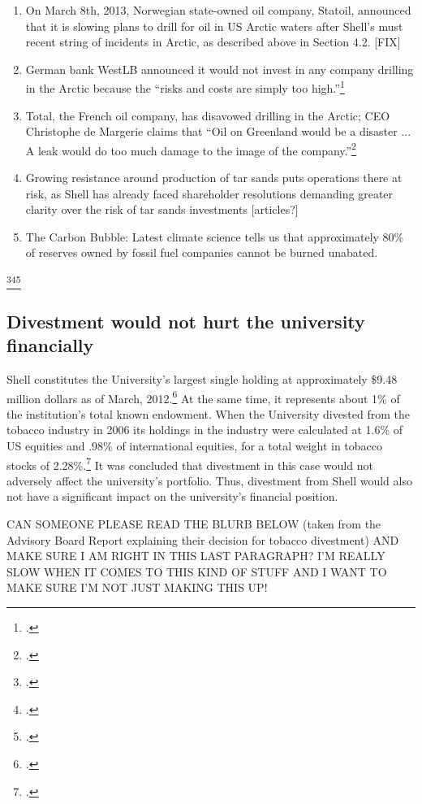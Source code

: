 \begin{enumerate}
	\item On March 8th, 2013, Norwegian state-owned oil company, Statoil, announced that it is slowing plans to drill for oil in US Arctic waters after Shell’s must recent string of incidents in Arctic, as described above in Section 4.2. [FIX]
	\item German bank WestLB announced it would not invest in any company drilling in the Arctic because the ``risks and costs are simply too high.''\footcite[][]{Naidoo_2012}
	\item Total, the French oil company, has disavowed drilling in the Arctic; CEO Christophe de Margerie claims that ``Oil on Greenland would be a disaster ... A leak would do too much damage to the image of the company.''\footcite[][]{NewsWire_2012}
	\item Growing resistance around production of tar sands puts operations there at risk, as Shell has already faced shareholder resolutions demanding greater clarity over the risk of tar sands investments [articles?]
	\item The Carbon Bubble: Latest climate science tells us that approximately 80\% of reserves owned by fossil fuel companies cannot be burned unabated.
\end{enumerate}\footcite[][]{carbontracker}\footcite[][]{UNEP_2009}\footcite[][]{HSBC_2013}


	\subsection{Divestment would not hurt the university financially}
	


Shell constitutes the University’s largest single holding at approximately \$9.48 million dollars as of March, 2012.\footcite[][]{UTAM_2012}  
At the same time, it represents about 1\% of the institution’s total known endowment. 
When the University divested from the tobacco industry in 2006 its holdings in the industry were calculated at 1.6\% of US equities and .98\% of international equities, for a total weight in tobacco stocks of 2.28\%.\footcite[][]{TobaccoReport_2007}
It was concluded that divestment in this case would not adversely affect the university’s portfolio. 
Thus, divestment from Shell would also not have a significant impact on the university’s financial position. 



\begin{vcom}
CAN SOMEONE PLEASE READ THE BLURB BELOW (taken from the Advisory Board Report explaining their decision for tobacco divestment) AND MAKE SURE I AM RIGHT IN THIS LAST PARAGRAPH? I’M REALLY SLOW WHEN IT COMES TO THIS KIND OF STUFF AND I WANT TO MAKE SURE I’M NOT JUST MAKING THIS UP!
\end{vcom}



